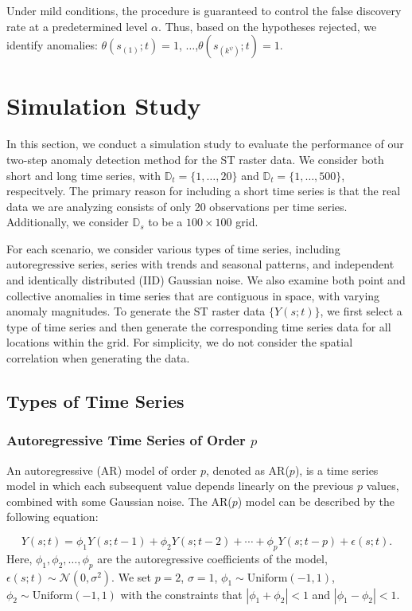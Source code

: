 \documentclass[11pt]{article}
\begin{document}
Under mild conditions, the procedure is guaranteed to control the false discovery rate at a predetermined level $\alpha$. Thus, based on the hypotheses rejected, we identify anomalies: $\theta(s_{(1)};t)=1$, $\ldots$,$\theta(s_{(k^{\psi})};t)=1$.





\section{Simulation Study}\label{sec: simulation}
In this section, we conduct a simulation study to evaluate the performance of our two-step anomaly detection method for the ST raster data. We consider both short and long time series, with $\mathbb{D}_t=\{1,\ldots,20\}$ and $\mathbb{D}_t=\{1,\ldots,500\}$, respecitvely. The primary reason for including a short time series is that the real data we are analyzing consists of only 20 observations per time series. Additionally, we consider $\mathbb{D}_s$ to be a $100\times 100$ grid. 

For each scenario, we consider various types of time series, including autoregressive series, series with trends and seasonal patterns, and independent and identically distributed (IID) Gaussian noise. We also examine both point and collective anomalies in time series that are contiguous in space, with varying anomaly magnitudes.  
To generate the ST raster data $\{Y(s;t)\}$, we first select a type of time series and then generate the corresponding time series data for all locations within the grid. For simplicity, we do not consider the spatial correlation when generating the data. 

\subsection{Types of Time Series}
\subsubsection*{Autoregressive Time Series of Order $p$}
An autoregressive (AR) model of order $p$, denoted as AR($p$), is a time series model in which each subsequent value depends linearly on the previous $p$ values, combined with some Gaussian noise. The AR($p$) model can be described by the following equation:

\begin{equation}
	Y(s;t) = \phi_1 Y(s;t-1) + \phi_2 Y(s;t-2) + \cdots + \phi_p Y(s;t-p) + \epsilon(s;t).
\end{equation}
Here, $\phi_1, \phi_2, \dots, \phi_p$ are the autoregressive coefficients of the model, $\epsilon(s;t) \sim \mathcal{N}(0, \sigma^2)$. We set $p=2$, $\sigma=1$, $\phi_1\sim \mathrm{Uniform}(-1,1)$, $\phi_2 \sim \mathrm{Uniform(-1,1)}$ with the constraints that $|\phi_1+\phi_2|<1$ and $|\phi_1-\phi_2|<1$.
\end{document}
